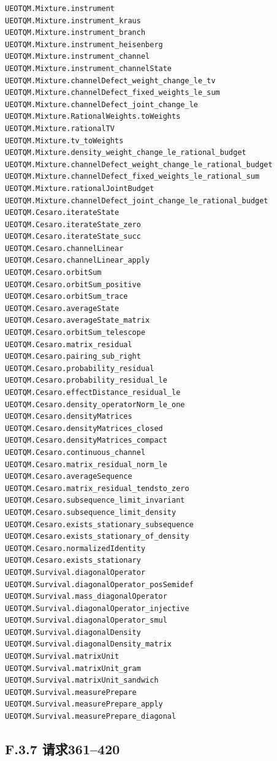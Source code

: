 \documentclass[
  11pt,
  oneside]{book}
\begin{document}
\begin{Verbatim}[breaklines,breakanywhere,fontsize=\scriptsize]
UEOTQM.Mixture.instrument
UEOTQM.Mixture.instrument_kraus
UEOTQM.Mixture.instrument_branch
UEOTQM.Mixture.instrument_heisenberg
UEOTQM.Mixture.instrument_channel
UEOTQM.Mixture.instrument_channelState
UEOTQM.Mixture.channelDefect_weight_change_le_tv
UEOTQM.Mixture.channelDefect_fixed_weights_le_sum
UEOTQM.Mixture.channelDefect_joint_change_le
UEOTQM.Mixture.RationalWeights.toWeights
UEOTQM.Mixture.rationalTV
UEOTQM.Mixture.tv_toWeights
UEOTQM.Mixture.density_weight_change_le_rational_budget
UEOTQM.Mixture.channelDefect_weight_change_le_rational_budget
UEOTQM.Mixture.channelDefect_fixed_weights_le_rational_sum
UEOTQM.Mixture.rationalJointBudget
UEOTQM.Mixture.channelDefect_joint_change_le_rational_budget
UEOTQM.Cesaro.iterateState
UEOTQM.Cesaro.iterateState_zero
UEOTQM.Cesaro.iterateState_succ
UEOTQM.Cesaro.channelLinear
UEOTQM.Cesaro.channelLinear_apply
UEOTQM.Cesaro.orbitSum
UEOTQM.Cesaro.orbitSum_positive
UEOTQM.Cesaro.orbitSum_trace
UEOTQM.Cesaro.averageState
UEOTQM.Cesaro.averageState_matrix
UEOTQM.Cesaro.orbitSum_telescope
UEOTQM.Cesaro.matrix_residual
UEOTQM.Cesaro.pairing_sub_right
UEOTQM.Cesaro.probability_residual
UEOTQM.Cesaro.probability_residual_le
UEOTQM.Cesaro.effectDistance_residual_le
UEOTQM.Cesaro.density_operatorNorm_le_one
UEOTQM.Cesaro.densityMatrices
UEOTQM.Cesaro.densityMatrices_closed
UEOTQM.Cesaro.densityMatrices_compact
UEOTQM.Cesaro.continuous_channel
UEOTQM.Cesaro.matrix_residual_norm_le
UEOTQM.Cesaro.averageSequence
UEOTQM.Cesaro.matrix_residual_tendsto_zero
UEOTQM.Cesaro.subsequence_limit_invariant
UEOTQM.Cesaro.subsequence_limit_density
UEOTQM.Cesaro.exists_stationary_subsequence
UEOTQM.Cesaro.exists_stationary_of_density
UEOTQM.Cesaro.normalizedIdentity
UEOTQM.Cesaro.exists_stationary
UEOTQM.Survival.diagonalOperator
UEOTQM.Survival.diagonalOperator_posSemidef
UEOTQM.Survival.mass_diagonalOperator
UEOTQM.Survival.diagonalOperator_injective
UEOTQM.Survival.diagonalOperator_smul
UEOTQM.Survival.diagonalDensity
UEOTQM.Survival.diagonalDensity_matrix
UEOTQM.Survival.matrixUnit
UEOTQM.Survival.matrixUnit_gram
UEOTQM.Survival.matrixUnit_sandwich
UEOTQM.Survival.measurePrepare
UEOTQM.Survival.measurePrepare_apply
UEOTQM.Survival.measurePrepare_diagonal
\end{Verbatim}

\hypertarget{f.3.7-ux8bf7ux6c42361420}{%
\subsection{F.3.7 请求361--420}\label{f.3.7-ux8bf7ux6c42361420}}
\end{document}
